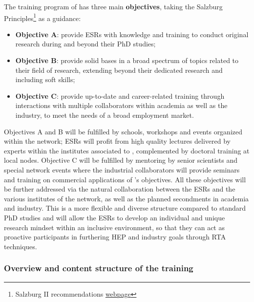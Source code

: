 The training program of \acronym has three main {\bf objectives}, taking the Salzburg Principles\footnote{Salzburg II recommendations \href{http://www.eua.be/Libraries/publications-homepage-list/Salzburg_II_Recommendations}{webpage}} as a guidance: 
\begin{itemize}
\item {\bf Objective A}: provide ESRs with knowledge and training to conduct original research during and beyond their PhD studies;
\item {\bf Objective B}: provide solid bases in a broad spectrum of topics related to their field of research, extending beyond their dedicated research and including soft skills; 
\item {\bf Objective C}: provide up-to-date and career-related training through interactions with multiple collaborators within academia as well as the industry, to meet the needs of a broad employment market.
\end{itemize}

Objectives A and B will be fulfilled by schools, workshops and events organized within the network; ESRs will profit from high quality lectures delivered by experts within the institutes associated to \acronym, complemented by doctoral training at local nodes. Objective C will be fulfilled by mentoring by senior scientists and special network events where the industrial collaborators will provide seminars and training on commercial applications of \acronym's objectives. All these objectives will be further addressed via the natural collaboration between the ESRs and the various institutes of the network, as well as the planned secondments in academia and industry. This is a more flexible and diverse structure compared to standard PhD studies and will allow the ESRs to develop an individual and unique research mindset within an inclusive environment, so that they can act as proactive participants in furthering HEP and industry goals through RTA techniques.

\vspace{-2mm}
\subsubsection{Overview and content structure of the training}
\label{sub:overviewTraining}

